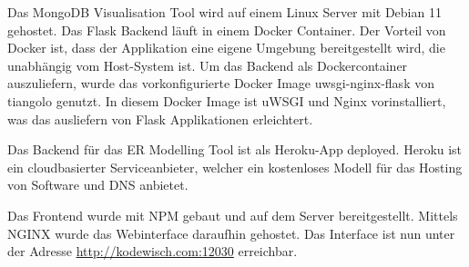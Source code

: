 \iffalse
Aufgabe des Kapitels Inbetriebnahme ist es, die Überführung der in 
Kapitel \ref{cha:implementierung} entwickelte Lösung in das betriebliche 
Umfeld aufzuzeigen. Dabei wird beispielsweise die Inbetriebnahme eines 
Programms beschrieben oder die Integration eines erstellten 
Programmodules dargestellt.

Bei der Software-Erstellung entspricht dieses Kapitel der 
Auslieferungsphase (Deployment) im \ac{rup}.
\fi

Das MongoDB Visualisation Tool wird auf einem Linux Server mit Debian 11 gehostet.
Das Flask Backend läuft in einem Docker Container.
Der Vorteil von Docker ist, dass der Applikation eine eigene Umgebung bereitgestellt wird, die unabhängig vom Host-System ist.
Um das Backend als Dockercontainer auszuliefern, wurde das vorkonfigurierte Docker Image uwsgi-nginx-flask von tiangolo genutzt.
In diesem Docker Image ist uWSGI und Nginx vorinstalliert, was das ausliefern von Flask Applikationen erleichtert.
~\autocite{tiangolo:uwsgi-nginx-flask}

Das Backend für das ER Modelling Tool ist als Heroku-App deployed.
Heroku ist ein cloudbasierter Serviceanbieter, welcher ein kostenloses Modell für das Hosting von Software und DNS anbietet.

Das Frontend wurde mit NPM gebaut und auf dem Server bereitgestellt.
Mittels NGINX wurde das Webinterface daraufhin gehostet. 
Das Interface ist nun unter der Adresse \url{http://kodewisch.com:12030} erreichbar.
